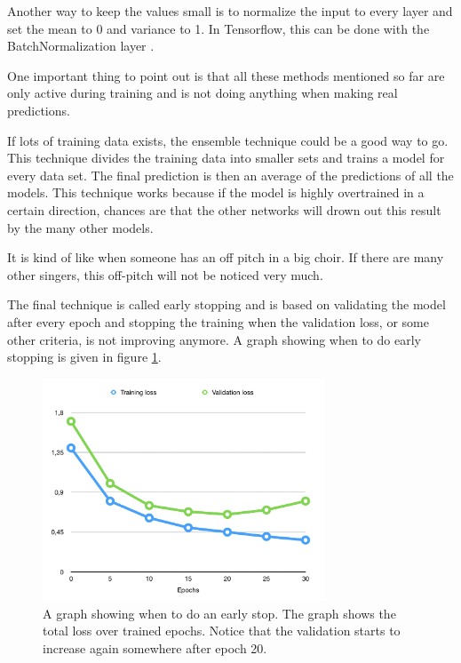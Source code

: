 Another way to keep the values small is to normalize the input to every layer and set the mean to 0 and variance to 1. In Tensorflow, this can be done with the BatchNormalization layer \cite{batchnormalization}.

One important thing to point out is that all these methods mentioned so far are only active during training and is not doing anything when making real predictions.

If lots of training data exists, the ensemble technique could be a good way to go. This technique divides the training data into smaller sets and trains a model for every data set.
The final prediction is then an average of the predictions of all the models. This technique works because if the model is highly overtrained in a certain direction, chances are that the other networks will drown out this result by the many other models.

It is kind of like when someone has an off pitch in a big choir. If there are many other singers, this off-pitch will not be noticed very much.

The final technique is called early stopping and is based on validating the model after every 
epoch and stopping the training when the validation loss, or some other criteria, is not 
improving anymore. A graph showing when to do early stopping is given in figure \ref{fig:earlystopping}.

\begin{figure}[hbtp]
\begin{center}
\includegraphics[width = 0.75\textwidth]{./Images/early_stop.jpg} 
\caption{A graph showing when to do an early stop. The graph shows the total loss over trained epochs. Notice that the validation starts to increase again somewhere after epoch 20.}
\label{fig:earlystopping}
\end{center}
\end{figure}

